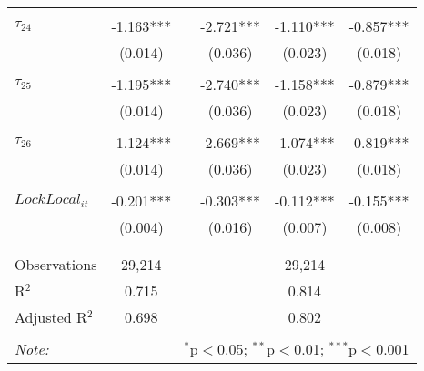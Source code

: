 \begin{tabular}{@{\extracolsep{-5pt}}lccccc}
                &           &&           &           &           \\[-2.1ex]
$\tau_{24}$     & -1.163*** && -2.721*** & -1.110*** & -0.857*** \\
                &  (0.014)  &&  (0.036)  &  (0.023)  &  (0.018)  \\
                &           &&           &           &           \\[-2.1ex]
$\tau_{25}$     & -1.195*** && -2.740*** & -1.158*** & -0.879*** \\
                &  (0.014)  &&  (0.036)  &  (0.023)  &  (0.018)  \\
                &           &&           &           &           \\[-2.1ex]
$\tau_{26}$     & -1.124*** && -2.669*** & -1.074*** & -0.819*** \\
                &  (0.014)  &&  (0.036)  &  (0.023)  &  (0.018)  \\
                &           &&           &           &           \\[-1.ex]
$LockLocal_{it}$ & -0.201*** && -0.303*** & -0.112*** & -0.155*** \\
                &  (0.004)  &&  (0.016)  &  (0.007)  &  (0.008)  \\
                &           &&           &           &           \\[-2.1ex]
\hline \\[-1.8ex] 
Observations     & 29,214 && \multicolumn{3}{c}{29,214} \\ 
R$^{2}$          &  0.715 && \multicolumn{3}{c}{0.814 } \\ 
Adjusted R$^{2}$ &  0.698 && \multicolumn{3}{c}{0.802 } \\ 
\hline 
\hline \\[-1.8ex] 
\textit{Note:}  & \multicolumn{5}{r}{$^{*}$p$<$0.05; $^{**}$p$<$0.01; $^{***}$p$<$0.001} \\ 
\end{tabular} 